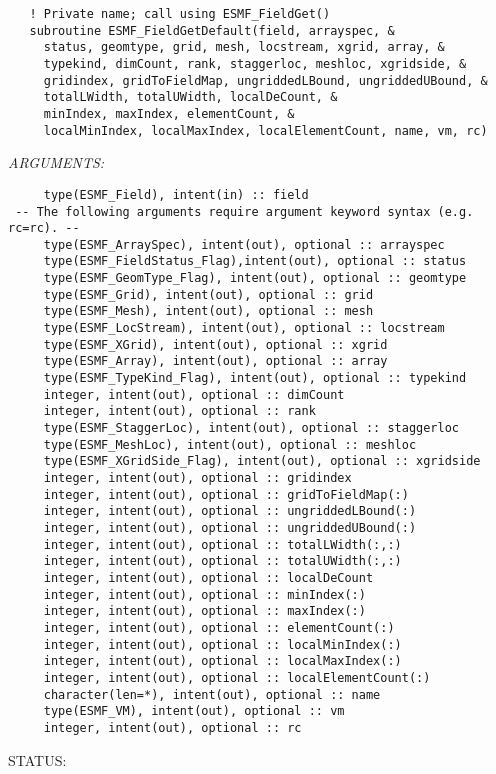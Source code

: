 \begin{verbatim}   ! Private name; call using ESMF_FieldGet()
   subroutine ESMF_FieldGetDefault(field, arrayspec, &
     status, geomtype, grid, mesh, locstream, xgrid, array, &
     typekind, dimCount, rank, staggerloc, meshloc, xgridside, &
     gridindex, gridToFieldMap, ungriddedLBound, ungriddedUBound, &
     totalLWidth, totalUWidth, localDeCount, &
     minIndex, maxIndex, elementCount, &
     localMinIndex, localMaxIndex, localElementCount, name, vm, rc)\end{verbatim}{\em ARGUMENTS:}
\begin{verbatim}     type(ESMF_Field), intent(in) :: field
 -- The following arguments require argument keyword syntax (e.g. rc=rc). --
     type(ESMF_ArraySpec), intent(out), optional :: arrayspec
     type(ESMF_FieldStatus_Flag),intent(out), optional :: status
     type(ESMF_GeomType_Flag), intent(out), optional :: geomtype
     type(ESMF_Grid), intent(out), optional :: grid
     type(ESMF_Mesh), intent(out), optional :: mesh
     type(ESMF_LocStream), intent(out), optional :: locstream
     type(ESMF_XGrid), intent(out), optional :: xgrid
     type(ESMF_Array), intent(out), optional :: array
     type(ESMF_TypeKind_Flag), intent(out), optional :: typekind
     integer, intent(out), optional :: dimCount
     integer, intent(out), optional :: rank
     type(ESMF_StaggerLoc), intent(out), optional :: staggerloc
     type(ESMF_MeshLoc), intent(out), optional :: meshloc
     type(ESMF_XGridSide_Flag), intent(out), optional :: xgridside
     integer, intent(out), optional :: gridindex
     integer, intent(out), optional :: gridToFieldMap(:)
     integer, intent(out), optional :: ungriddedLBound(:)
     integer, intent(out), optional :: ungriddedUBound(:)
     integer, intent(out), optional :: totalLWidth(:,:)
     integer, intent(out), optional :: totalUWidth(:,:)
     integer, intent(out), optional :: localDeCount
     integer, intent(out), optional :: minIndex(:)
     integer, intent(out), optional :: maxIndex(:)
     integer, intent(out), optional :: elementCount(:)
     integer, intent(out), optional :: localMinIndex(:)
     integer, intent(out), optional :: localMaxIndex(:)
     integer, intent(out), optional :: localElementCount(:)
     character(len=*), intent(out), optional :: name
     type(ESMF_VM), intent(out), optional :: vm
     integer, intent(out), optional :: rc\end{verbatim}
{\sf STATUS:}
